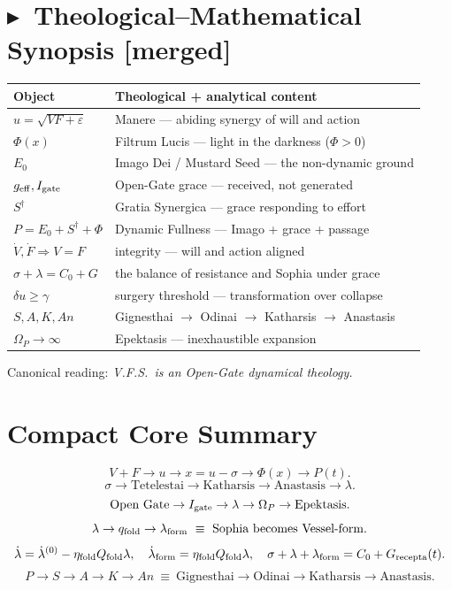 \documentclass[11pt,a4paper]{article}
\newcommand{\Syn}{\ensuremath{S^{\dagger}}}
\newcommand{\pflag}{{\footnotesize\textsf{\textcolor{patchc}{[merged]}}}}
\theoremstyle{plain}
\theoremstyle{definition}
\theoremstyle{remark}
\begin{document}
\newpage
\section{\texorpdfstring{\textcolor{patchc}{$\blacktriangleright$}\ }{}Theological--Mathematical Synopsis \pflag}
\renewcommand{\arraystretch}{1.18}
\begin{longtable}{@{}>{\raggedright\arraybackslash}p{4.2cm}>{\raggedright\arraybackslash}p{10.5cm}@{}}
\hline
\textbf{Object} & \textbf{Theological + analytical content}\\
\hline
\(u=\sqrt{VF+\varepsilon}\) & Manere --- abiding synergy of will and action\\
\(\Phi(x)\) & Filtrum Lucis --- light in the darkness (\(\Phi>0\))\\
\(E_0\) & Imago Dei / Mustard Seed --- the non-dynamic ground\\
\(g_{\rm eff},I_{\rm gate}\) & Open-Gate grace --- received, not generated\\
\Syn & Gratia Synergica --- grace responding to effort\\
\(P=E_0+\Syn+\Phi\) & Dynamic Fullness --- Imago + grace + passage\\
\(\dot V,\dot F\Rightarrow V{=}F\) & integrity --- will and action aligned\\
\(\sigma+\lambda=C_0+G\) & the balance of resistance and Sophia under grace\\
\(\delta u\ge\gamma\) & surgery threshold --- transformation over collapse\\
\(S,A,K,An\) & Gignesthai \(\to\) Odinai \(\to\) Katharsis \(\to\) Anastasis\\
\(\Omega_P\to\infty\) & Epektasis --- inexhaustible expansion\\
\hline
\end{longtable}
Canonical reading: \emph{V.F.S.\ is an Open-Gate dynamical theology.}

\newpage
\section{Compact Core Summary}
\[
V+F\to u\to x=u-\sigma\to\Phi(x)\to P(t).
\]
\[
\sigma\to\text{Tetelestai}\to\text{Katharsis}\to\text{Anastasis}\to\lambda.
\]
\[
\text{Open Gate}\to I_{\rm gate}\to\lambda\to\Omega_P\to\text{Epektasis}.
\]
\[
\lambda\to q_{\rm fold}\to\lambda_{\rm form}\ \equiv\ \text{Sophia becomes Vessel-form}.
\]
\[
\dot\lambda=\dot\lambda^{(0)}-\eta_{\rm fold}Q_{\rm fold}\lambda,\quad
\dot\lambda_{\rm form}=\eta_{\rm fold}Q_{\rm fold}\lambda,\quad
\sigma+\lambda+\lambda_{\rm form}=C_0+G_{\rm recepta}(t).
\]
\[
P\to S\to A\to K\to An\ \equiv\ \text{Gignesthai}\to\text{Odinai}\to\text{Katharsis}\to\text{Anastasis}.
\]
\end{document}
